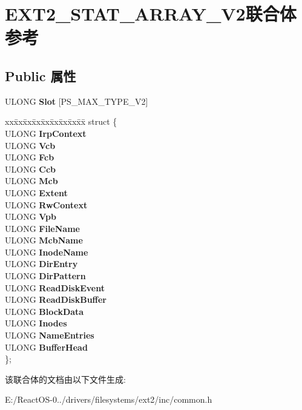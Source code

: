 \hypertarget{union_e_x_t2___s_t_a_t___a_r_r_a_y___v2}{}\section{E\+X\+T2\+\_\+\+S\+T\+A\+T\+\_\+\+A\+R\+R\+A\+Y\+\_\+\+V2联合体 参考}
\label{union_e_x_t2___s_t_a_t___a_r_r_a_y___v2}
\subsection*{Public 属性}
\begin{DoxyCompactItemize}
\item 
\mbox{\label{union_e_x_t2___s_t_a_t___a_r_r_a_y___v2_ae10bd34c7f710d29ab11891d2a458fdb}} 
U\+L\+O\+NG {\bfseries Slot} \mbox{[}P\+S\+\_\+\+M\+A\+X\+\_\+\+T\+Y\+P\+E\+\_\+\+V2\mbox{]}
\item 
\mbox{\label{union_e_x_t2___s_t_a_t___a_r_r_a_y___v2_aa928ab14409121f0ca545904f9c9f244}} 
\begin{tabbing}
xx\=xx\=xx\=xx\=xx\=xx\=xx\=xx\=xx\=\kill
struct \{\\
\>ULONG {\bfseries IrpContext}\\
\>ULONG {\bfseries Vcb}\\
\>ULONG {\bfseries Fcb}\\
\>ULONG {\bfseries Ccb}\\
\>ULONG {\bfseries Mcb}\\
\>ULONG {\bfseries Extent}\\
\>ULONG {\bfseries RwContext}\\
\>ULONG {\bfseries Vpb}\\
\>ULONG {\bfseries FileName}\\
\>ULONG {\bfseries McbName}\\
\>ULONG {\bfseries InodeName}\\
\>ULONG {\bfseries DirEntry}\\
\>ULONG {\bfseries DirPattern}\\
\>ULONG {\bfseries ReadDiskEvent}\\
\>ULONG {\bfseries ReadDiskBuffer}\\
\>ULONG {\bfseries BlockData}\\
\>ULONG {\bfseries Inodes}\\
\>ULONG {\bfseries NameEntries}\\
\>ULONG {\bfseries BufferHead}\\
\}; \\

\end{tabbing}\end{DoxyCompactItemize}


该联合体的文档由以下文件生成\+:\begin{DoxyCompactItemize}
\item 
E\+:/\+React\+O\+S-\/0../drivers/filesystems/ext2/inc/common.\+h\end{DoxyCompactItemize}
